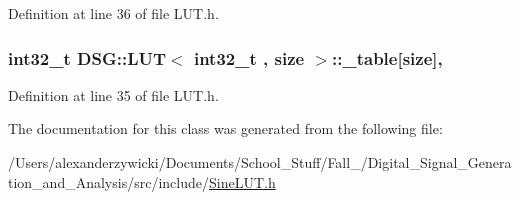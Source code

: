 Definition at line 36 of file L\+U\+T.\+h.

\hypertarget{classDSG_1_1LUT_ac8b23bbb7ce259d4ceb1c6fa93a7f29f}{
\subsubsection[{\+\_\+table}]{\setlength{\rightskip}{0pt plus 5cm}int32\+\_\+t  {\bf D\+S\+G\+::\+L\+U\+T}$<$ int32\+\_\+t , size $>$\+::\+\_\+table\mbox{[}size\mbox{]}\hspace{0.3cm}{\ttfamily [protected]}, {\ttfamily [inherited]}}}\label{classDSG_1_1LUT_ac8b23bbb7ce259d4ceb1c6fa93a7f29f}


Definition at line 35 of file L\+U\+T.\+h.



The documentation for this class was generated from the following file\+:\begin{DoxyCompactItemize}
\item 
/\+Users/alexanderzywicki/\+Documents/\+School\+\_\+\+Stuff/\+Fall\+\_/\+Digital\+\_\+\+Signal\+\_\+\+Generation\+\_\+and\+\_\+\+Analysis/src/include/\hyperlink{SineLUT_8h}{Sine\+L\+U\+T.\+h}\end{DoxyCompactItemize}
